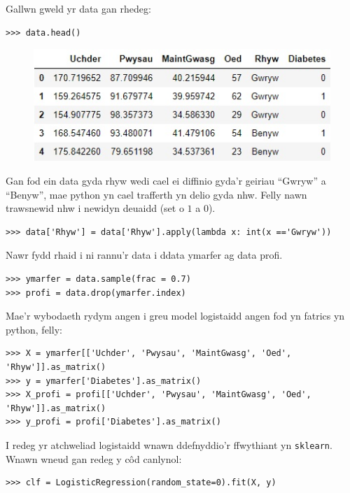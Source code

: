 Gallwn gweld yr data gan rhedeg:

\begin{verbatim}
>>> data.head()
\end{verbatim}

\begin{figure}[H]
\begin{center}
\includegraphics[width=0.5\linewidth]{../img/data_diabetes_python.jpg}
\end{center}
\end{figure}

Gan fod ein data gyda rhyw wedi cael ei diffinio gyda'r geiriau ``Gwryw'' a ``Benyw'', mae python yn cael trafferth yn delio gyda nhw. Felly nawn trawsnewid nhw i newidyn deuaidd (set o $1$ a $0$).

\begin{verbatim}
>>> data['Rhyw'] = data['Rhyw'].apply(lambda x: int(x =='Gwryw'))
\end{verbatim}

Nawr fydd rhaid i ni rannu'r data i ddata ymarfer ag data profi.

\begin{verbatim}
>>> ymarfer = data.sample(frac = 0.7)
>>> profi = data.drop(ymarfer.index)
\end{verbatim}

Mae'r wybodaeth rydym angen i greu model logistaidd angen fod yn fatrics yn python, felly:

\begin{verbatim}
>>> X = ymarfer[['Uchder', 'Pwysau', 'MaintGwasg', 'Oed', 'Rhyw']].as_matrix()
>>> y = ymarfer['Diabetes'].as_matrix()
>>> X_profi = profi[['Uchder', 'Pwysau', 'MaintGwasg', 'Oed', 'Rhyw']].as_matrix()
>>> y_profi = profi['Diabetes'].as_matrix()
\end{verbatim}

I redeg yr atchweliad logistaidd wnawn ddefnyddio'r ffwythiant yn \texttt{sklearn}. Wnawn wneud gan redeg y c\^{o}d canlynol:

\begin{verbatim}
>>> clf = LogisticRegression(random_state=0).fit(X, y)
\end{verbatim}

